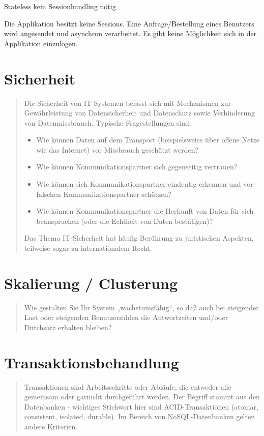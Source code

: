 Stateless kein Sessionhandling nötig

Die Applikation besitzt keine Sessions. Eine Anfrage/Bestellung eines Benutzers wird angesendet und asynchron verarbeitet. Es gibt keine Möglichkeit sich in der Applikation einzulogen.

\section{Sicherheit}

\begin{quote}
	Die Sicherheit von IT-Systemen befasst sich mit Mechanismen zur Gewährleistung von Datensicherheit und Datenschutz sowie Verhinderung von Datenmissbrauch.
	Typische Fragestellungen sind:
	\begin{itemize}
		\item Wie können Daten auf dem Transport (beispielsweise über offene Netze wie das Internet) vor Missbrauch geschützt werden?
		\item Wie können Kommunikationspartner sich gegenseitig vertrauen?
		\item Wie können sich Kommunikationspartner eindeutig erkennen und vor falschen Kommunikationspartner schützen?
		\item Wie können Kommunikationspartner die Herkunft von Daten für sich beanspruchen (oder die Echtheit von Daten bestätigen)?
	\end{itemize}
	Das Thema IT-Sicherheit hat häufig Berührung zu juristischen Aspekten, teilweise sogar zu internationalem Recht.
\end{quote}

\section{Skalierung / Clusterung}

\begin{quote}
	Wie gestalten Sie Ihr System „wachstumsfähig“, so daß auch bei steigender Last oder steigenden Benutzerzahlen die Antwortzeiten und/oder Durchsatz erhalten bleiben?
\end{quote}

\section{Transaktionsbehandlung}

\begin{quote}
	Transaktionen sind Arbeitsschritte oder Abläufe, die entweder alle gemeinsam oder garnicht durchgeführt werden. Der Begriff stammt aus den Datenbanken - wichtiges Stichwort hier sind ACID-Transaktionen (atomar, consistent, isolated, durable). Im Bereich von NoSQL-Datenbanken gelten andere Kriterien.
\end{quote}

